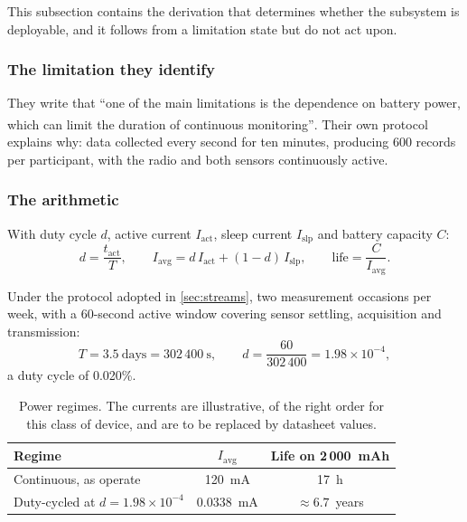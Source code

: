 \documentclass[12pt,a4paper,oneside]{report}
\newcommand{\bq}[1]{``#1''\textsuperscript{\dag}}
\begin{document}
This subsection contains the derivation that determines whether the subsystem is deployable, and it follows from a limitation \textcite{efendi2025} state but do not act upon.

\subsubsection{The limitation they identify}

They write that \bq{one of the main limitations is the dependence on battery power, which can limit the duration of continuous monitoring}. Their own protocol explains why: data collected every second for ten minutes, producing 600 records per participant, with the radio and both sensors continuously active.

\subsubsection{The arithmetic}\label{sec:power-arithmetic}

With duty cycle $d$, active current $I_{\text{act}}$, sleep current $I_{\text{slp}}$ and battery capacity $C$:
\begin{equation}
  d = \frac{t_{\text{act}}}{T}, \qquad
  I_{\text{avg}} = d\,I_{\text{act}} + (1-d)\,I_{\text{slp}}, \qquad
  \text{life} = \frac{C}{I_{\text{avg}}}.
\end{equation}

Under the protocol adopted in \cref{sec:streams}, two measurement occasions per week, with a 60-second active window covering sensor settling, acquisition and transmission:
\begin{equation}
  T = 3.5~\text{days} = 302\,400~\text{s},
  \qquad d = \frac{60}{302\,400} = 1.98 \times 10^{-4},
\end{equation}
a duty cycle of 0.020\%.

\begin{table}[htbp]
\centering\small
\caption{Power regimes. The currents are illustrative, of the right order for this class of device, and are to be replaced by datasheet values.}\label{tab:power-regimes}
\begin{tabularx}{\textwidth}{@{}X c c@{}}
\toprule
\textbf{Regime} & \textbf{$I_{\text{avg}}$} & \textbf{Life on 2\,000~mAh} \\
\midrule
Continuous, as \textcite{efendi2025} operate & 120~mA & 17~h \\
Duty-cycled at $d = 1.98\times10^{-4}$ & 0.0338~mA & $\approx 6.7$~years \\
\bottomrule
\end{tabularx}
\end{table}
\end{document}
